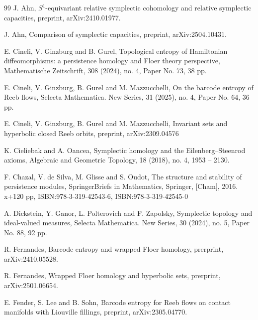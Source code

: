 \documentclass[12pt]{amsart}
\theoremstyle{definition}
\begin{document}
\begin{thebibliography} {99}
 J. Ahn, $S^1$-equivariant relative symplectic cohomology and relative symplectic capacities, preprint,  arXiv:2410.01977.

 J. Ahn, Comparison of symplectic capacities, preprint, arXiv:2504.10431.


  E. Cineli, V. Ginzburg and B. Gurel, Topological entropy of Hamiltonian diffeomorphisms: a persistence homology and Floer theory perspective, Mathematische Zeitschrift, 308 (2024), no. 4, Paper No. 73, 38 pp.

 E. Cineli, V. Ginzburg, B. Gurel and M. Mazzucchelli, On the barcode entropy of Reeb flows, Selecta Mathematica. New Series,
 31 (2025), no. 4, Paper No. 64, 36 pp.

 E. Cineli, V. Ginzburg, B. Gurel and M. Mazzucchelli, Invariant sets and hyperbolic closed Reeb orbits, preprint, arXiv:2309.04576

  K. Cieliebak and A. Oancea, Symplectic homology and the Eilenberg–Steenrod axioms, Algebraic and Geometric Topology, 18 (2018), no. 4, 1953 – 2130.

 F. Chazal, V. de Silva, M. Glisse and S. Oudot, The structure and stability of persistence modules, SpringerBriefs in Mathematics, Springer, [Cham], 2016. x+120 pp, ISBN:978-3-319-42543-6, ISBN:978-3-319-42545-0


 A. Dickstein, Y. Ganor, L. Polterovich and F. Zapolsky, Symplectic topology and ideal-valued measures, Selecta Mathematica. New Series, 30 (2024), no. 5, Paper No. 88, 92 pp.

 R. Fernandes, Barcode entropy and wrapped Floer homology, prerprint, arXiv:2410.05528.

 R. Fernandes, Wrapped Floer homology and hyperbolic sets, prerprint, arXiv:2501.06654.

 E. Fender, S. Lee and B. Sohn, Barcode entropy for Reeb flows on contact manifolds with Liouville fillings, preprint, arXiv:2305.04770.


\end{thebibliography}
\end{document}

